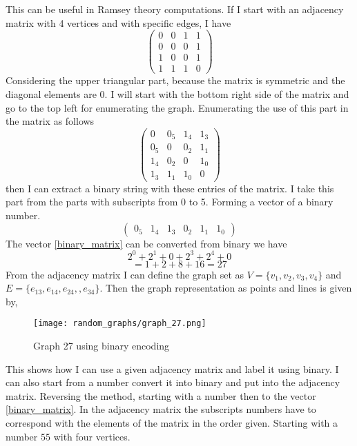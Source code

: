 \documentclass{Assignment}
\begin{document}
This can be useful in Ramsey theory computations.
If I start with an adjacency matrix with 4 vertices and with specific edges, I have
\begin{equation}
	\begin{pmatrix}
		0&0&1&1\\
		0&0&0&1\\
		1&0&0&1\\	
		1&1&1&0
	\end{pmatrix}
\end{equation}
Considering the upper triangular part, because the matrix is symmetric and the diagonal elements are 0.
I will start with the bottom right side of the matrix and go to the top left for enumerating the graph.
Enumerating the use of this part in the matrix as follows
\begin{equation}
	\begin{pmatrix}
		0&0_5&1_4&1_3\\
		0_5&0&0_2&1_1\\
		1_4&0_2&0&1_0\\	
		1_3&1_1&1_0&0
	\end{pmatrix}\label{adj_mat}
\end{equation}
then I can extract a binary string with these entries of the matrix.
I take this part from the parts with subscripts from 0 to 5.
Forming a vector of a binary number.
\begin{equation}
	\begin{pmatrix}
		0_5&1_4&1_3&0_2&1_1&1_0
	\end{pmatrix}\label{binary_matrix}
\end{equation}
The vector \eqref{binary_matrix} can be converted from binary we have $$2^0+2^1+0+2^3+2^4+0$$$$=1+2+8+16=27$$
From the adjacency matrix I can define the graph set as $V =\{v_1,v_2,v_3,v_4\}$ and $E = \{e_{13} , e_{14},e_{24},,e_{34}\}$.
Then the graph representation as points and lines is given by,
\begin{figure}[H]
	\centering
	\texttt{[image: random\_graphs/graph\_27.png]}
	\caption{Graph 27 using binary encoding}
	\label{graph 27}
\end{figure}
This shows how I can use a given adjacency matrix and label it using binary.
I can also start from a number convert it into binary and put into the adjacency matrix.
Reversing the method, starting with a number then to the vector \eqref{binary_matrix}.
In the adjacency matrix the subscripts numbers have to correspond with the elements of the matrix in the order given.
Starting with a number $ 55$ with four vertices.
\end{document}

